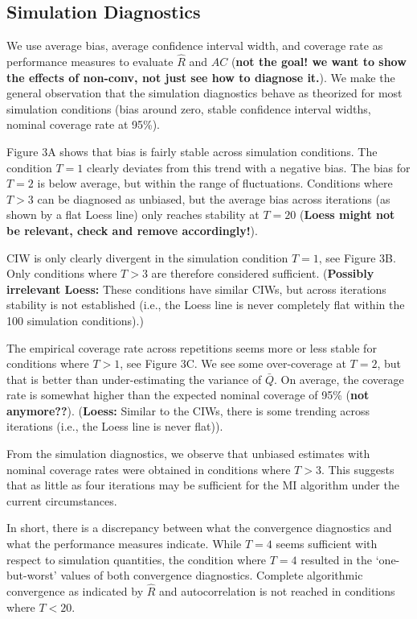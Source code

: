 \documentclass[Royal,times,sageh]{sagej}
\begin{document}
\hypertarget{simulation-diagnostics}{%
\subsection{Simulation Diagnostics}\label{simulation-diagnostics}}

We use average bias, average confidence interval width, and coverage
rate as performance measures to evaluate \(\widehat{R}\) and \(AC\)
(\textbf{not the goal! we want to show the effects of non-conv, not just
see how to diagnose it.}). We make the general observation that the
simulation diagnostics behave as theorized for most simulation
conditions (bias around zero, stable confidence interval widths, nominal
coverage rate at 95\%).

Figure 3A shows that bias is fairly stable across simulation conditions.
The condition \(T=1\) clearly deviates from this trend with a negative
bias. The bias for \(T=2\) is below average, but within the range of
fluctuations. Conditions where \(T>3\) can be diagnosed as unbiased, but
the average bias across iterations (as shown by a flat Loess line) only
reaches stability at \(T=20\) (\textbf{Loess might not be relevant,
check and remove accordingly!}).

CIW is only clearly divergent in the simulation condition \(T=1\), see
Figure 3B. Only conditions where \(T>3\) are therefore considered
sufficient. (\textbf{Possibly irrelevant Loess:} These conditions have
similar CIWs, but across iterations stability is not established (i.e.,
the Loess line is never completely flat within the 100 simulation
conditions).)

The empirical coverage rate across repetitions seems more or less stable
for conditions where \(T>1\), see Figure 3C. We see some over-coverage
at \(T=2\), but that is better than under-estimating the variance of
\(\bar{Q}\). On average, the coverage rate is somewhat higher than the
expected nominal coverage of 95\% \citep{neym34} (\textbf{not
anymore??}). (\textbf{Loess:} Similar to the CIWs, there is some
trending across iterations (i.e., the Loess line is never flat)).

From the simulation diagnostics, we observe that unbiased estimates with
nominal coverage rates were obtained in conditions where \(T>3\). This
suggests that as little as four iterations may be sufficient for the MI
algorithm under the current circumstances.

In short, there is a discrepancy between what the convergence
diagnostics and what the performance measures indicate. While \(T=4\)
seems sufficient with respect to simulation quantities, the condition
where \(T=4\) resulted in the `one-but-worst' values of both convergence
diagnostics. Complete algorithmic convergence as indicated by
\(\widehat{R}\) and autocorrelation is not reached in conditions where
\(T<20\).
\end{document}
